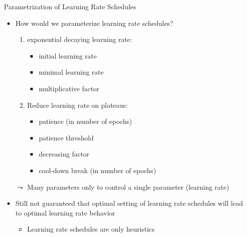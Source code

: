 \begin{frame}[c]{Parametrization of Learning Rate Schedules}

\begin{itemize}
  \item How would we parameterize learning rate schedules?
  \begin{enumerate}
  	\item exponential decaying learning rate:
  	\begin{itemize}
  	  \item initial learning rate
  	  \item minimal learning rate
  	  \item multiplicative factor
  	\end{itemize}
  	\pause
  	\item Reduce learning rate on plateaus:
  	\begin{itemize}
  	  \item patience (in number of epochs)
  	  \item patience threshold
  	  \item decreasing factor
  	  \item cool-down break (in number of epochs)
  	\end{itemize}
  \end{enumerate}
  \pause
  \medskip
  \item[$\leadsto$] Many parameters only to control a single parameter (learning rate)
  \pause   
  \item Still not guaranteed that optimal setting of learning rate schedules will lead to optimal learning rate behavior
  \begin{itemize}
    \item Learning rate schedules are only heuristics
  \end{itemize}
\end{itemize}

\end{frame}
